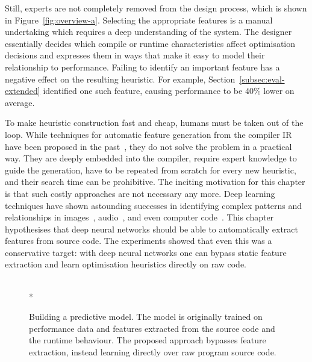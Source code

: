 Still, experts are not completely removed from the design process, which is shown in Figure~\ref{fig:overview-a}. Selecting the appropriate features is a manual undertaking which requires a deep understanding of the system. The designer essentially decides which compile or runtime characteristics affect optimisation decisions and expresses them in ways that make it easy to model their relationship to performance. Failing to identify an important feature has a negative effect on the resulting heuristic. For example, Section~\ref{subsec:eval-extended} identified one such feature, causing performance to be 40\% lower on average.

To make heuristic construction fast and cheap, humans must be taken out of the loop. While techniques for automatic feature generation from the compiler IR have been proposed in the past~\cite{Namolaru2010a,Leather2014}, they do not solve the problem in a practical way. They are deeply embedded into the compiler, require expert knowledge to guide the generation, have to be repeated from scratch for every new heuristic, and their search time can be prohibitive. The inciting motivation for this chapter is that such costly approaches are not necessary any more. Deep learning techniques have shown astounding successes in identifying complex patterns and relationships in images~\cite{Krizhevsky2012,He2016}, audio~\cite{Lee2009b}, and even computer code~\cite{Allamanis2014,Allamanis2014a}. This chapter hypothesises that deep neural networks should be able to automatically extract features from source code. The experiments showed that even this was a conservative target: with deep neural networks one can bypass static feature extraction and learn optimisation heuristics directly on raw code.

\begin{figure}[t!]
	\centering
	\\*%
	\caption[Using machine learning for compiler optimisations]{%
		Building a predictive model. The model is originally trained on performance data and features extracted from the source code and the runtime behaviour. The proposed approach bypasses feature extraction, instead learning directly over raw program source code.%
	}%
	\label{fig:overview}
\end{figure}

